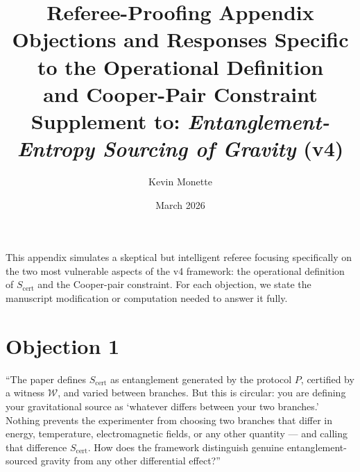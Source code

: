 \documentclass[11pt,letterpaper]{article}
\title{\textbf{Referee-Proofing Appendix}\\[4pt]
\large Objections and Responses Specific to the Operational Definition\\
and Cooper-Pair Constraint\\[3pt]
\normalsize Supplement to: \textit{Entanglement-Entropy Sourcing of Gravity} (v4)}
\author{Kevin Monette}
\date{March 2026}
\newcommand{\Scert}{S_{\mathrm{cert}}}
\begin{document}
\maketitle

This appendix simulates a skeptical but intelligent referee focusing specifically on the
two most vulnerable aspects of the v4 framework: the operational definition of $\Scert$
and the Cooper-pair constraint.  For each objection, we state the manuscript modification
or computation needed to answer it fully.

\section*{Objection 1}

\begin{tcolorbox}[breakable,enhanced,colback=red!3,colframe=red!60!black,
  fonttitle=\bfseries,title={Referee Objection 1: The definition is circular},
  boxrule=0.8pt]
``The paper defines $\Scert$ as entanglement generated by the protocol $P$, certified by
a witness $\mathcal{W}$, and varied between branches.  But this is circular: you are
defining your gravitational source as `whatever differs between your two branches.'
Nothing prevents the experimenter from choosing two branches that differ in energy,
temperature, electromagnetic fields, or any other quantity --- and calling that difference
$\Scert$.  How does the framework distinguish genuine entanglement-sourced gravity from
any other differential effect?''
\end{tcolorbox}
\end{document}
